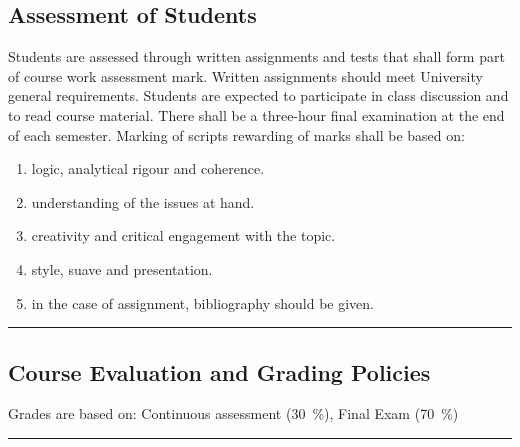 \subsection*{Assessment of Students}
\begin{outline}
    \1 Students are assessed through written assignments and tests that shall form part of course work assessment mark.
    \1 Written assignments should meet University general requirements.
    \1 Students are expected to participate in class discussion and to read course material.
    \1 There shall be a three-hour final examination at the end of each semester.
    \1 Marking of scripts rewarding of marks shall be based on:
        \begin{enumerate}
            \item logic, analytical rigour and coherence.
            \item understanding of the issues at hand.
            \item creativity and critical engagement with the topic.
            \item style, suave and presentation.
            \item in the case of assignment, bibliography should be given.
        \end{enumerate}

\end{outline}
\vspace{2ex}\hrule\vspace{2ex}

\subsection*{Course Evaluation and Grading Policies}
Grades are based on:
    Continuous assessment (\qty{30}{\percent}),
    Final Exam (\qty{70}{\percent})
\vspace{2ex}\hrule\vspace{2ex}



